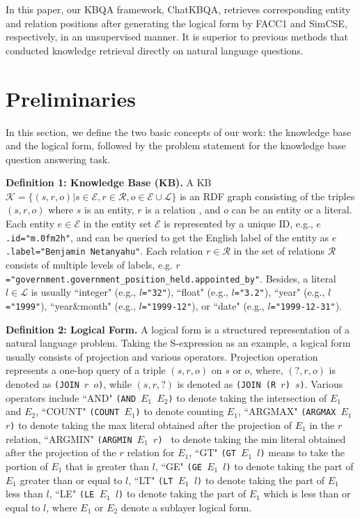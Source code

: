 \documentclass{article} \usepackage{iclr2024_conference,times}
\begin{document}
In this paper, our KBQA framework, ChatKBQA, retrieves corresponding entity and relation positions after generating the logical form by FACC1 and SimCSE, respectively, in an unsupervised manner. It is superior to previous methods that conducted knowledge retrieval directly on natural language questions.

\section{Preliminaries}

In this section, we define the two basic concepts of our work: the knowledge base and the logical form, followed by the problem statement for the knowledge base question answering task.

\textbf{Definition 1: Knowledge Base (KB).} A KB $\mathcal{K}=\{(s,r,o)|s \in \mathcal{E}, r \in \mathcal{R}, o \in \mathcal{E} \cup \mathcal{L}\}$ is an RDF graph consisting of the triples $(s,r,o)$ where $s$ is an entity, $r$ is a relation , and $o$ can be an entity or a literal. Each entity $e \in \mathcal{E}$ in the entity set $\mathcal{E}$ is represented by a unique ID, e.g., \texttt{$e$.id="m.0fm2h"}, and can be queried to get the English label of the entity as \texttt{$e$.label="Benjamin\ Netanyahu"}. Each relation $r \in \mathcal{R}$ in the set of relations $\mathcal{R}$ consists of multiple levels of labels, e.g. \texttt{$r$="government.government\_position\_held.appointed\_by"}. Besides, a literal $l \in \mathcal{L}$ is usually ``integer" (e.g., \texttt{$l$="32"}), ``float" (e.g., \texttt{$l$="3.2"}), ``year" (e.g., \texttt{$l$="1999"}), ``year\&month" (e.g., \texttt{$l$="1999-12"}), or ``date" (e.g., \texttt{$l$="1999-12-31"}).

\textbf{Definition 2: Logical Form. }A logical form is a structured representation of a natural language problem. Taking the S-expression as an example, a logical form usually consists of projection and various operators. Projection operation represents a one-hop query of a triple $(s,r,o)$ on $s$ or $o$, where, $(?,r,o)$ is denoted as \texttt{(JOIN $r$ $o$)}, while $(s,r,?)$ is denoted as \texttt{(JOIN (R $r$) $s$)}. Various operators include ``AND" \texttt{(AND $E_1$ $E_2$)} to denote taking the intersection of $E_1$ and $E_2$, ``COUNT" \texttt{(COUNT $E_1$)} to denote counting $E_1$, ``ARGMAX" \texttt{(ARGMAX $E_1$ $r$)} to denote taking the max literal obtained after the projection of $E_1$ in the $r$ relation, ``ARGMIN" \texttt{(ARGMIN $E_1$ $r$) } to denote taking the min literal obtained after the projection of the $r$ relation for $E_1$, ``GT" \texttt{(GT $E_1$ $l$)} means to take the portion of $E_1$ that is greater than $l$, ``GE" \texttt {(GE $E_1$ $l$)} to denote taking the part of $E_1$ greater than or equal to $l$, ``LT" \texttt{(LT $E_1$ $l$)} to denote taking the part of $E_1$ less than $l$, ``LE" \texttt{(LE $E_1$ $l$)} to denote taking the part of $E_1$ which is less than or equal to $l$, where $E_1$ or $E_2$ denote a sublayer logical form.
\end{document}
